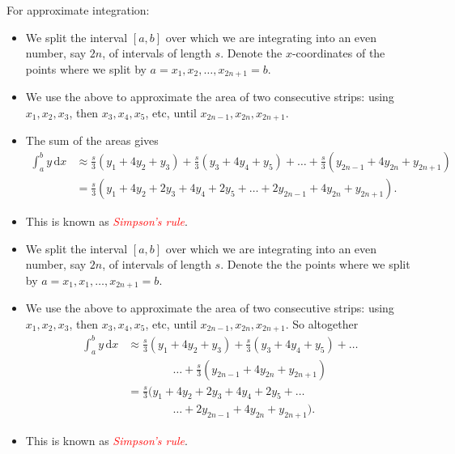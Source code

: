 \documentclass[
  11pt,
  oneside]{book}
\providecommand{\tightlist}{%
  \setlength{\itemsep}{0pt}\setlength{\parskip}{0pt}}
\theoremstyle{definition}
\theoremstyle{definition}
\theoremstyle{definition}
\theoremstyle{definition}
\theoremstyle{remark}
\begin{document}
\begin{notslides}

For approximate integration:

\begin{itemize}
\tightlist
\item
  We split the interval \([a,b]\) over which we are integrating into an even number, say \(2n\), of intervals of length \(s\). Denote the \(x\)-coordinates of the points where we split by \(a=x_1, x_2,\dots,x_{2n+1}=b\).
\item
  We use the above to approximate the area of two consecutive strips: using \(x_1,x_2,x_3\), then \(x_3,x_4,x_5\), etc, until \(x_{2n-1},x_{2n},x_{2n+1}\).
\item
  The sum of the areas gives
  \begin{align*}
  \int_{a}^{b}y\,\mathrm{d}x& \approx \frac s3\left(y_1+4y_2+y_3\right) + \frac s3\left(y_3+4y_4+y_5\right) + \dots + \frac s3\left(y_{2n-1}+4y_{2n}+y_{2n+1}\right)\\
  &=\frac s3\left(y_1+4y_2+2y_3+4y_4+2y_5+\dots +2y_{2n-1}+4y_{2n}+y_{2n+1}\right).
  \end{align*}
\item
  This is known as \textcolor{red}{\em Simpson's rule}.
\end{itemize}

\end{notslides}

\begin{slidesonly}

\begin{itemize}
\tightlist
\item
  We split the interval \([a,b]\) over which we are integrating into an even number, say \(2n\), of intervals of length \(s\). Denote the the points where we split by \(a=x_1, x_1,\dots,x_{2n+1}=b\).
\item
  We use the above to approximate the area of two consecutive strips: using \(x_1,x_2,x_3\), then \(x_3,x_4,x_5\), etc, until \(x_{2n-1},x_{2n},x_{2n+1}\). So altogether
  \begin{align*}
  \int_{a}^{b}y\,\mathrm{d}x& \approx \frac s3\left(y_1+4y_2+y_3\right) + \frac s3\left(y_3+4y_4+y_5\right) + \dots\\
  & \qquad\qquad \dots + \frac s3\left(y_{2n-1}+4y_{2n}+y_{2n+1}\right)\\
  &=\frac s3(y_1+4y_2+2y_3+4y_4+2y_5+\dots\\
  & \qquad\qquad \dots +2y_{2n-1}+4y_{2n}+y_{2n+1}).
  \end{align*}
\item
  This is known as \textcolor{red}{\em Simpson's rule}.
\end{itemize}

\end{slidesonly}
\end{document}
